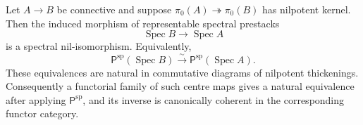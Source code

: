 \begin{lemma}
\label{lem:bnli-representable-prored-thickening}
Let $A\to B$ be connective and suppose
$\pi_0(A)\twoheadrightarrow\pi_0(B)$ has nilpotent kernel.  Then the induced
morphism of representable spectral prestacks
\[
    \operatorname{Spec}B\longrightarrow\operatorname{Spec}A
\]
is a spectral nil-isomorphism.  Equivalently,
\[
\boxed{
    \mathsf P^{\mathrm{sp}}(\operatorname{Spec}B)
    \xrightarrow{\sim}
    \mathsf P^{\mathrm{sp}}(\operatorname{Spec}A).}
\]
These equivalences are natural in commutative diagrams of nilpotent
thickenings.  Consequently a functorial family of such centre maps gives a
natural equivalence after applying $\mathsf P^{\mathrm{sp}}$, and its inverse
is canonically coherent in the corresponding functor category.
\end{lemma}

